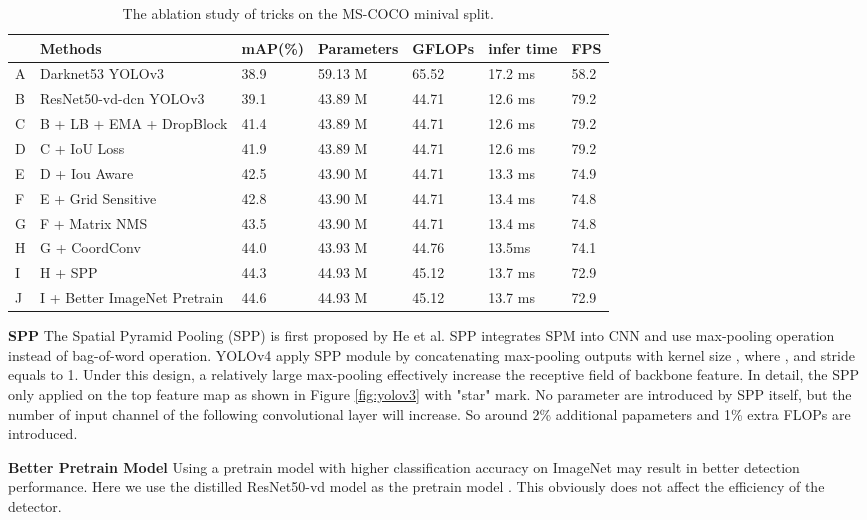 \documentclass[10pt,twocolumn,letterpaper]{article}
\newcommand{\pheadB}[1] {\vspace{1mm}\noindent\textbf{#1}}
\begin{document}
	\begin{table*}[t!]
		\centering
\begin{tabular}{l|l|l|l|l|l|l}
			\hline
			& \textbf{Methods} & \textbf{mAP(\%)} & \textbf{Parameters} & \textbf{GFLOPs} & 
			\textbf{infer time} & \textbf{FPS} \\ 
			\hline
			\hline
			A & Darknet53 YOLOv3 & 38.9 &59.13 M & 65.52 & 17.2 ms & 58.2  \\ 
			\hline
			\hline
			B & ResNet50-vd-dcn YOLOv3 & 39.1 &43.89 M & 44.71 & 12.6 ms& 79.2 \\ 
			C & B + LB + EMA + DropBlock & 41.4 &43.89 M  & 44.71& 12.6 ms& 79.2\\ 
			D & C +  IoU Loss & 41.9 &43.89 M & 44.71 & 12.6 ms& 79.2 \\ 
			E & D + Iou Aware & 42.5 &43.90 M & 44.71 & 13.3 ms& 74.9\\ 
			F & E + Grid Sensitive& 42.8 &43.90 M & 44.71 & 13.4 ms& 74.8 \\ 
			G & F + Matrix NMS & 43.5 &43.90 M & 44.71& 13.4 ms& 74.8  \\ 
			H & G + CoordConv  & 44.0 &43.93 M & 44.76 & 13.5ms& 74.1 \\ 
			I & H + SPP & 44.3 &44.93 M & 45.12 & 13.7 ms& 72.9 \\
			J & I + Better ImageNet Pretrain  & 44.6 &44.93 M & 45.12 & 13.7 ms& 72.9  \\ 
			\hline
		\end{tabular}
\caption{The ablation study of tricks on the MS-COCO minival split.}
		\label{tab1}
	\end{table*}
	
	\pheadB{SPP} \cite{spp}
	The Spatial Pyramid Pooling (SPP) is first proposed by He et al\cite{spp}. SPP integrates SPM into CNN and use max-pooling operation instead of bag-of-word operation. 
	YOLOv4 apply SPP module by concatenating max-pooling outputs with kernel size , where , and stride equals to 1. Under this design, a relatively large  max-pooling effectively increase the receptive field of backbone feature. In detail, the SPP only applied on the top feature map as shown in Figure \ref{fig:yolov3} with "star" mark. No parameter are introduced by SPP itself, but the number of input channel of the following convolutional layer will increase. So around 2\% additional papameters and 1\% extra FLOPs are introduced.
	
	\pheadB{Better Pretrain Model}
	Using a pretrain model with higher classification accuracy on ImageNet may result in better detection performance. Here we use the distilled ResNet50-vd model as the pretrain model \cite{pretrain} . This obviously does not affect the efficiency of the detector.
	
\end{document}
